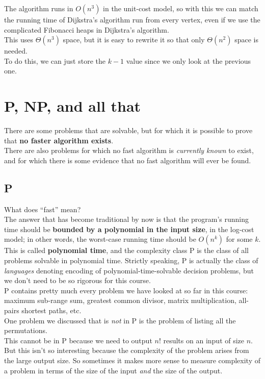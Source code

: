 \documentclass[12pt]{article}
\theoremstyle{plain}
\theoremstyle{definition}
\begin{document}
The algorithm runs in $O(n^{3})$ in the unit-cost model, so with this we can match the running time of Dijkstra's algorithm run from every vertex, even if we use the complicated Fibonacci heaps in Dijkstra's algorithm. \\

This uses $\Theta(n^{3})$ space, but it is easy to rewrite it so that only $\Theta(n^{2})$ space is needed. \\
To do this, we can just store the $k-1$ value since we only look at the previous one.

\newpage
\section{P, NP, and all that}
There are some problems that are solvable, but for which it is possible to prove that \textbf{no faster algorithm exists}. \\
There are also problems for which no fast algorithm is \emph{currently known} to exist, and for which there is some evidence that no fast algorithm will ever be found.

\subsection{P}
What does ``fast'' mean? \\
The answer that has become traditional by now is that the program's running time should be \textbf{bounded by a polynomial in the input size}, in the log-cost model;
in other words, the worst-case running time should be $O(n^{k})$ for some $k$. \\
This is called \textbf{polynomial time}, and the complexity class P is the class of all problems solvable in polynomial time.
Strictly speaking, P is actually the class of \emph{languages} denoting encoding of polynomial-time-solvable decision problems, but we don't need to be so rigorous for this course. \\

P contains pretty much every problem we have looked at so far in this course: maximum sub-range sum, greatest common divisor, matrix multiplication, all-pairs shortest paths, etc. \\

One problem we discussed that is \emph{not} in P is the problem of listing all the permutations. \\
This cannot be in P because we need to output $n!$ results on an input of size $n$. \\
But this isn't so interesting because the complexity of the problem arises from the large output size.
So sometimes it makes more sense to measure complexity of a problem in terms of the size of the input \emph{and} the size of the output. \\
\end{document}
